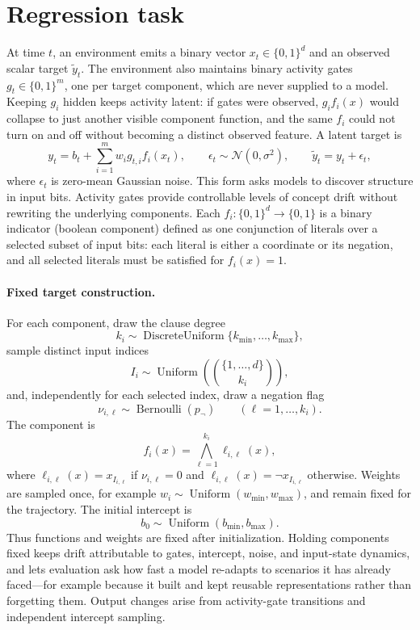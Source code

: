 \documentclass[11pt]{article}
\begin{document}
\section{Regression task}
At time $t$, an environment emits a binary vector $x_t\in\{0,1\}^d$ and an
observed scalar target $\tilde y_t$.  The environment also maintains binary
activity gates $g_t\in\{0,1\}^m$, one per target component, which are never
supplied to a model.  Keeping $g_i$ hidden keeps activity latent: if gates were
observed, $g_i f_i(x)$ would collapse to just another visible component
function, and the same $f_i$ could not turn on and off without becoming a
distinct observed feature.  A latent target is
\[
y_t=b_t+\sum_{i=1}^{m}w_i g_{t,i} f_i(x_t),
\qquad
\epsilon_t\sim\mathcal N(0,\sigma^2),
\qquad
\tilde y_t=y_t+\epsilon_t,
\]
where $\epsilon_t$ is zero-mean Gaussian noise.  This form asks models to
discover structure in input bits.  Activity gates provide controllable levels
of concept drift without rewriting the underlying components.  Each
$f_i:\{0,1\}^d\to\{0,1\}$ is a binary indicator (boolean component) defined
as one conjunction of literals over a selected subset of input bits: each
literal is either a coordinate or its negation, and all selected literals must
be satisfied for $f_i(x)=1$.

\paragraph{Fixed target construction.}
For each component, draw the clause degree
\[
 k_i\sim\operatorname{DiscreteUniform}
 \{k_{\min},\ldots,k_{\max}\},
\]
sample distinct input indices
\[
 I_i\sim\operatorname{Uniform}\!\left(
 \binom{\{1,\ldots,d\}}{k_i}\right),
\]
and, independently for each selected index, draw a negation flag
\[
 \nu_{i,\ell}\sim\operatorname{Bernoulli}(p_{\neg})
 \qquad (\ell=1,\ldots,k_i).
\]
The component is
\[
 f_i(x)=\bigwedge_{\ell=1}^{k_i}\ell_{i,\ell}(x),
\]
where $\ell_{i,\ell}(x)=x_{I_{i,\ell}}$ if $\nu_{i,\ell}=0$ and
$\ell_{i,\ell}(x)=\neg x_{I_{i,\ell}}$ otherwise.
Weights are sampled once, for example
$w_i\sim\operatorname{Uniform}(w_{\min},w_{\max})$, and remain fixed for the
trajectory.  The initial intercept is
\[
 b_0\sim\operatorname{Uniform}(b_{\min},b_{\max}).
\]
Thus functions and weights are fixed after initialization.  Holding components
fixed keeps drift attributable to gates, intercept, noise, and input-state
dynamics, and lets evaluation ask how fast a model re-adapts to scenarios it
has already faced---for example because it built and kept reusable
representations rather than forgetting them.  Output changes arise from
activity-gate transitions and independent intercept sampling.
\end{document}
